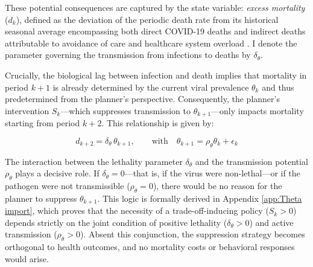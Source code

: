 \documentclass[12pt, a4paper]{article}
\begin{document}
These potential consequences are captured by the state variable: \textit{excess mortality} ($d_k$), defined as the deviation of the periodic death rate from its historical seasonal average encompassing both direct COVID-19 deaths and indirect deaths attributable to avoidance of care and healthcare system overload \citep{Msemburi2023WHO, owid_em}. I denote the parameter governing the transmission from infections to deaths by $\delta_\theta$.

Crucially, the biological lag between infection and death implies that mortality in period $k+1$ is already determined by the current viral prevalence $\theta_k$ and thus predetermined from the planner's perspective. Consequently, the planner's intervention $S_k$---which suppresses transmission to $\theta_{k+1}$---only impacts mortality starting from period $k+2$. This relationship is given by:

\begin{equation}
    d_{k+2} = \delta_\theta \, \theta_{k+1}, \qquad \text{with} \quad \theta_{k+1} = \rho_\theta \theta_k+\epsilon_k
    \label{eq:mortality_intro}
\end{equation}

The interaction between the lethality parameter $\delta_\theta$ and the transmission potential $\rho_\theta$ plays a decisive role. If $\delta_\theta = 0$---that is, if the virus were non-lethal---or if the pathogen were not transmissible ($\rho_\theta = 0$), there would be no reason for the planner to suppress $\theta_{k+1}$. This logic is formally derived in Appendix \ref{app:Theta import}, which proves that the necessity of a trade-off-inducing policy ($S_k > 0$) depends strictly on the joint condition of positive lethality ($\delta_\theta > 0$) and active transmission ($\rho_\theta > 0$). Absent this conjunction, the suppression strategy becomes orthogonal to health outcomes, and no mortality costs or behavioral responses would arise.


\end{document}

